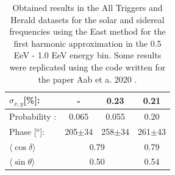\documentclass[12pt, doublespace, oneside]{article}
\begin{document}
\begin{table}[H]
\begin{small}
\begin{center}
\begin{tabular}[c]{l|c|c||c|}
\multicolumn{1}{|l|}{$\sigma_{x,y}$[\%]:        } & -	                    & 0.23	                    & 0.21       \\\hline
\multicolumn{1}{|l|}{Probability      :        } & 0.065                   & 0.055	                    & 0.20       \\
\multicolumn{1}{|l|}{Phase [$^o$]:                } & 205$\pm$34              & 258$\pm$34                & 261$\pm$43\\ \hline
\multicolumn{1}{|l|}{$\langle\cos\delta \rangle$} & \multicolumn{2}{c||}{0.79}        	                & 0.79 \cite{codigo}        \\        
\multicolumn{1}{|l|}{$\langle\sin\theta \rangle$} & \multicolumn{2}{c||}{0.50}        	                & 0.54\cite{codigo}        \\ \hline       
                \end{tabular}
            \end{center}
        \end{small}
        \vspace*{-0.4 cm}
        \caption{Obtained results in the All Triggers and Herald datasets for the solar and sidereal frequencies using the East method for the first harmonic approximation in the 0.5 EeV - 1.0 EeV energy bin. Some results were replicated using the code written for the paper Aab et a. 2020 \cite{Aab_2020}.}
        \label{tab:segundo_bin_data}
    \end{table}
    
\end{document}
